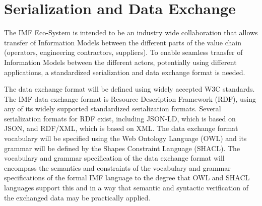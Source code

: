 \section{Serialization and Data Exchange}
The IMF Eco-System is intended to be an industry wide collaboration that allows transfer
of Information Models between the different parts of the value chain (operators, engineering contractors, suppliers).
To enable seamless transfer of Information Models between the different actors, potentially using different
applications, a standardized serialization and data exchange format is needed.

The data exchange format will be defined using widely accepted W3C standards. The IMF data exchange format is Resource
Description Framework (RDF), using any of its widely supported standardized serialization formats. Several
serialization formats for RDF exist, including JSON-LD, which is based on JSON, and RDF/XML, which is based on XML.
The data exchange format vocabulary will be specified using the Web Ontology Language (OWL) and its grammar will be
defined by the Shapes Constraint Language (SHACL). The vocabulary and grammar specification of the data exchange
format will encompass the semantics and constraints of the vocabulary and grammar specifications of the formal IMF
language to the degree that OWL and SHACL languages support this and in a way that semantic and syntactic
verification of the exchanged data may be practically applied.
